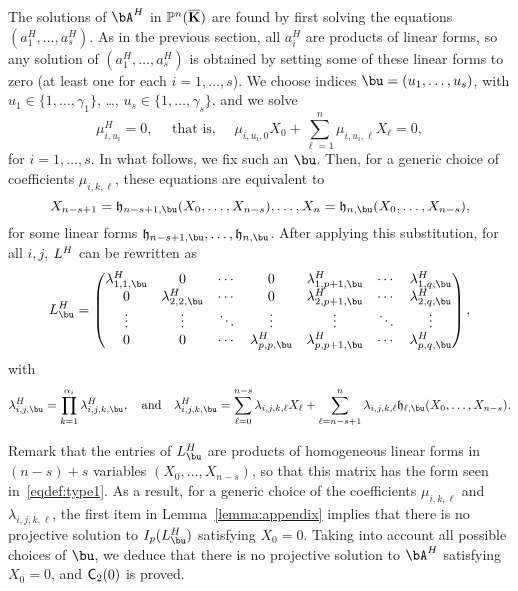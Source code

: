 \documentclass[12pt]{article}
\begin{document}
The solutions of $\bA^H$ in $\mathbb{P}^n(\overline{\mathbf{K}})$ are found by first solving
the equations $(a^H_1,\dots,a^H_s)$. As in the previous section, all
$a_i^H$ are products of linear forms, so any solution of
$(a^H_1,\dots,a^H_s)$ is obtained by setting some of these linear forms
to zero (at least one for each $i=1,\dots,s$). We choose indices $\bu=(u_1,\dots,u_s)$, with
$u_1\in\{1,\dots,\gamma_1\}$, \dots, $u_s\in\{1,\dots,\gamma_s\}$, and
we solve
$$\mu^H_{i,u_i}=0, \quad \text{~that is,~} \quad \mu_{i,u_i,0}X_0 + \sum_{\ell = 1}^{n}\mu_{i,u_i,\ell}X_\ell =0,$$ for $i=1,\dots,s$.
In what follows, we fix such an $\bu$.
Then, for a generic choice of coefficients $\mu_{i,k,\ell}$, these equations
are equivalent to
$$X_{n-s+1}=\mathfrak{h}_{n-s+1,\bu}(X_0,\dots,X_{n-s}),\dots,X_{n}=\mathfrak{h}_{n,\bu}(X_0,\dots,X_{n-s}),$$
for some linear forms $\mathfrak{h}_{n-s+1,\bu},\dots,\mathfrak{h}_{n,\bu}$.
After applying this substitution, for all $i,j$,
${L}^H$ can be rewritten as 
\begin{align*}
 \mL^H_\bu = \left( \begin{matrix}
\lambda^H_{1,1,\bu} & 0 & \cdots & 0 & \lambda^H_{1,p+1,\bu} & \cdots & \lambda^H_{1, q,\bu}\\
0 & \lambda^H_{2,2,\bu} & \cdots & 0 & \lambda^H_{2,p+1,\bu} & \cdots & \lambda^H_{2, q,\bu}\\
\vdots & \vdots & \ddots & \vdots & \vdots & \ddots & \vdots\\
0 & 0 & \cdots & \lambda^H_{p,p,\bu} & \lambda^H_{p,p+1,\bu} & \cdots & \lambda^H_{p, q,\bu}
\end{matrix} \right),
\end{align*}
with
$$\lambda^H_{i,j,\bu}=\prod_{k=1}^{\alpha_i}\lambda^H_{i,j,k,\bu},
\quad\text{and}\quad \lambda^H_{i,j,k,\bu}=\sum_{\ell =
  0}^{n-s}\lambda_{i,j,k,\ell}X_\ell + \sum_{\ell =
  n-s+1}^{n}\lambda_{i,j,k,\ell}
\mathfrak{h}_{\ell,\bu}(X_0,\dots,X_{n-s}).$$ 

Remark that the entries of $\mL^H_\bu$ are products of homogeneous
linear forms in $(n-s)+s$ variables $(X_0,\dots,X_{n-s})$, so that
this matrix has the form seen in~\eqref{eqdef:type1}. As a result, for
a generic choice of the coefficients $\mu_{i,k,\ell}$ and
$\lambda_{i,j,k,\ell}$, the first item in Lemma~\ref{lemma:appendix}
implies that there is no projective solution to $I_p(\mL^H_\bu)$
satisfying $X_0=0$. Taking into account all possible choices of $\bu$,
we deduce that there is no projective solution to $\bA^H$ satisfying
$X_0=0$, and  $\mathsf{C}_2(0)$ is proved.
\end{document}
